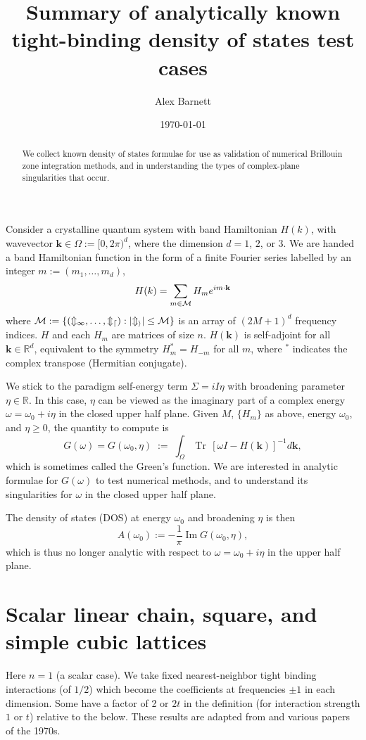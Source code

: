 \documentclass[11pt]{article}
\newcommand{\be}{\begin{equation}}
\newcommand{\ee}{\end{equation}}
\newcommand{\mbf}[1]{{\mathbf #1}}
\newcommand{\R}{\mathbb{R}}
\DeclareMathOperator{\im}{Im}
\DeclareMathOperator{\tr}{Tr}
\newcommand{\om}{\omega}
\newcommand{\BZ}{\Omega}
\newcommand{\kk}{\mbf{k}}
\begin{document}
\title{Summary of analytically known tight-binding density of states test cases}
\author{Alex Barnett}
\date{\today}
\maketitle
\begin{abstract}
  We collect known density of states formulae for use as validation
  of numerical Brillouin zone integration methods, and in understanding
  the types of complex-plane singularities that occur.
\end{abstract}

Consider a crystalline quantum system with band Hamiltonian $H(k)$,
with wavevector $\kk\in \BZ := [0,2\pi)^d$, where the dimension $d=1$, $2$, or $3$.
We are handed a band Hamiltonian function in the form of a finite Fourier
series labelled by an integer $m := (m_1,\dots,m_d)$,
\be
H(k) = \sum_{m\in{\cal M}} H_m e^{im\cdot \kk}
\label{Hk}
\ee
where $\cal M := \{(m_1,\dots,m_d): |m_i|\le M\}$ is an array of 
$(2M+1)^d$ frequency indices.
$H$ and each $H_m$ are matrices of size $n$.
$H(\kk)$ is self-adjoint for all $\kk\in\R^d$,
equivalent to the symmetry $H_m^* = H_{-m}$ for all $m$, where
$^*$ indicates the complex transpose (Hermitian conjugate).

We stick to the paradigm self-energy term $\Sigma = iI\eta$
with broadening parameter $\eta\in\R$.
In this case, $\eta$ can be viewed as the imaginary part of
a complex energy $\om = \om_0 + i\eta$ in the closed upper half plane.
Given $M$, $\{H_m\}$ as above, energy $\om_0$, and $\eta\ge0$,
the quantity to compute is
\be
G(\om) = G(\om_0,\eta) \;:=\;
\int_\BZ \tr\, [\om I - H(\kk)]^{-1} d\kk,
\label{G}
\ee
which is sometimes called the Green's function.
We are interested in analytic formulae for $G(\om)$ to
test numerical methods, and to understand
its singularities for $\om$ in the closed upper half plane.

The density of states (DOS) at energy $\om_0$ and broadening $\eta$ is then
\be
A(\om_0) := -\frac{1}{\pi}\im G(\om_0,\eta),
\label{DOS}
\ee
which is thus no longer analytic with respect to $\om=\om_0+i\eta$ in the upper half plane.

\section{Scalar linear chain, square, and simple cubic lattices}

Here $n=1$ (a scalar case). We take fixed
nearest-neighbor tight binding interactions (of $1/2$) which become
the coefficients at frequencies $\pm 1$ in each dimension.
Some have a factor of 2 or $2t$ in the definition (for interaction strength $1$ or $t$) relative to the below.
These results are adapted from \cite[Ch.~5]{economou}
and various papers of the 1970s.
\end{document}
